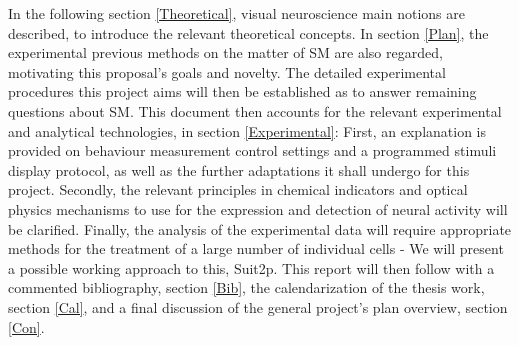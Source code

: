 In the following section \ref{Theoretical}, visual neuroscience main notions are described, to introduce the relevant theoretical concepts. In section \ref{Plan}, the experimental previous methods on the matter of SM are also regarded, motivating this proposal's goals and novelty. The detailed experimental procedures this project aims will then be established as to answer remaining questions about SM. This document then accounts for the relevant experimental and analytical technologies, in section \ref{Experimental}: First, an explanation is provided on behaviour measurement control settings and a programmed stimuli display protocol, as well as the further adaptations it shall undergo for this project. Secondly, the relevant principles in chemical indicators and optical physics mechanisms to use for the expression and detection of neural activity will be clarified. Finally, the analysis of the experimental data will require appropriate methods for the treatment of a large number of individual cells - We will present a possible working approach to this, Suit2p. This report will then follow with a commented bibliography, section \ref{Bib}, the calendarization of the thesis work, section \ref{Cal}, and a final discussion of the general project's plan overview, section \ref{Con}.





